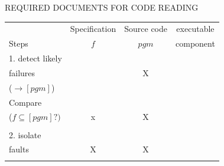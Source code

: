\newpage
\centerline{REQUIRED DOCUMENTS FOR CODE READING}
\bigskip

\begin{center}
\begin{tabular}{|l||c|c|c|}
\hline
               & Specification & Source code & executable\\
Steps          &     $f$       & $pgm$       & component\\
\hline
\hline
1. detect likely &             &             &      \\
failures       &               &      X      &      \\
($\rightarrow [pgm]$) &        &             &      \\
\hline
Compare        &               &             &      \\
($f\subseteq [pgm]?)$&   x     &      X      &      \\
               &               &             &      \\
\hline
2. isolate     &               &             &      \\
faults         &      X        &      X      &      \\
               &               &             &      \\
\hline
\end{tabular}
\end{center}
